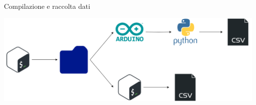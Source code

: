 
\begin{frame}{Compilazione e raccolta dati}

\begin{center}
    \includegraphics[height=0.3\textwidth]{images/workflow.png}
\end{center}

\end{frame}
